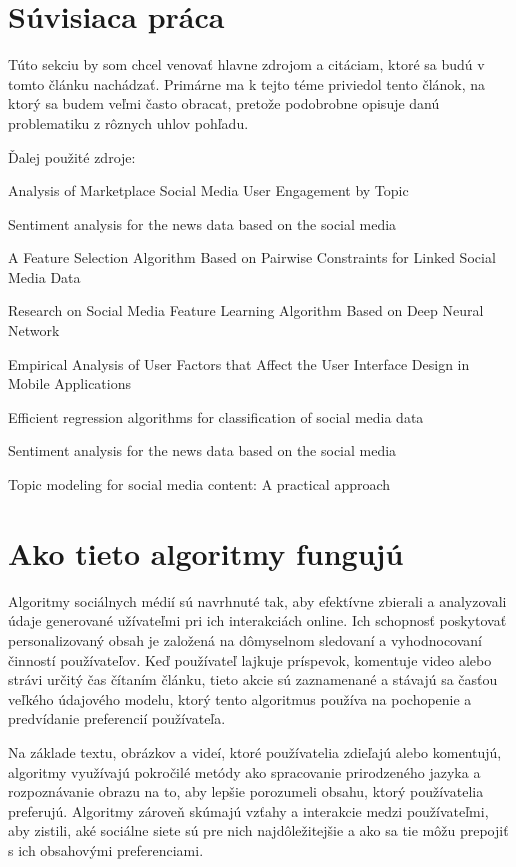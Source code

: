 \documentclass[12pt,twoside,slovak,a4paper]{article}
\begin{document}
\section{Súvisiaca práca} 
Túto sekciu by som chcel venovať hlavne zdrojom a citáciam, ktoré sa budú v tomto článku nachádzať. Primárne ma k tejto téme priviedol tento článok, na ktorý sa budem veľmi často obracat, pretože podobrobne opisuje danú problematiku z rôznych uhlov pohľadu.\cite{7809906} 

Ďalej použité zdroje:

Analysis of Marketplace Social Media User Engagement by Topic\cite{10057722}

Sentiment analysis for the news data based on the social media\cite{8250692}

A Feature Selection Algorithm Based on Pairwise Constraints for Linked Social Media 
Data\cite{8575882}

Research on Social Media Feature Learning Algorithm Based on Deep Neural Network\cite{9719080}

Empirical Analysis of User Factors that Affect the User Interface Design in Mobile 
Applications\cite{9325452}

Efficient regression algorithms for classification of social media data\cite{7087040}

Sentiment analysis for the news data based on the social media\cite{8250692}

Topic modeling for social media content: A practical approach\cite{7783248}


\section{Ako tieto algoritmy fungujú}
Algoritmy sociálnych médií sú navrhnuté tak, aby efektívne zbierali a analyzovali údaje generované užívateľmi pri ich interakciách online. Ich schopnosť poskytovať personalizovaný obsah je založená na dômyselnom sledovaní a vyhodnocovaní činností používateľov. Keď používateľ lajkuje príspevok, komentuje video alebo strávi určitý čas čítaním článku, tieto akcie sú zaznamenané a stávajú sa časťou veľkého údajového modelu, ktorý tento algoritmus používa na pochopenie a predvídanie preferencií používateľa.

Na základe textu, obrázkov a videí, ktoré používatelia zdieľajú alebo komentujú, algoritmy využívajú pokročilé metódy ako spracovanie prirodzeného jazyka a rozpoznávanie obrazu na to, aby lepšie porozumeli obsahu, ktorý používatelia preferujú. Algoritmy zároveň skúmajú vzťahy a interakcie medzi používateľmi, aby zistili, aké sociálne siete sú pre nich najdôležitejšie a ako sa tie môžu prepojiť s ich obsahovými preferenciami.
\end{document}
